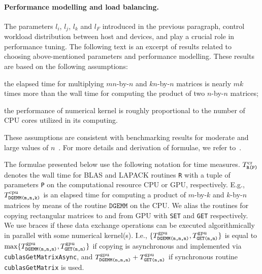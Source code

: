 \documentclass{llncs}
\begin{document}
    \paragraph{Performance modelling and load balancing.} \label{sec:load_balancing_parameters}

    The parameters $l_i$, $l_j$, $l_k$ and $l_F$ 
    introduced in the previous paragraph,
    control workload distribution between host and devices, 
    and play a crucial role in performance tuning.
    The following text is an excerpt of results related to 
    choosing above-mentioned parameters and performance modelling.
    These results are based on the following assumptions: 
    \begin{inparaenum}[(i)]
    \item the elapsed time for 
      multiplying $mn$-by-$n$ and $kn$-by-$n$ matrices
      is nearly $mk$ times more than the wall time for computing the product
      of two $n$-by-$n$ matrices;
    \item the performance of numerical kernel
      is roughly proportional to the number of CPU cores utilized in its computing.
    \end{inparaenum}
    These assumptions are consistent with benchmarking results 
    for moderate and large values of $n$~\cite{GogolenkoBai13}.
    For more details and derivation of formulae, we refer to~\cite{GogolenkoBai13}.

    The formulae presented below use the following notation for time measures.
    $T^{\rm cr}_{\texttt{R(P)}}$ denotes the wall time 
    for BLAS and LAPACK routines {\tt R} with a tuple of parameters {\tt P}
    on the computational resource CPU or GPU, respectively.
    E.g., $T^{\rm cpu}_{\texttt{DGEMM(m,n,k)}}$ is an elapsed time for 
    computing a product of $m$-by-$k$ and $k$-by-$n$ matrices
    by means of the routine $\texttt{DGEMM}$ on the CPU.
    We alias the routines for copying rectangular matrices to and from GPU 
    with {\tt SET} and {\tt GET} respectively.
    We use braces if 
    these data exchange operations can be executed algorithmically 
    in parallel with some numerical kernel(s).
    I.e., $\{T_{\texttt{DGEMM(n,n,n)}}^{\rm gpu},T^{\rm gpu}_{\texttt{GET(n,n)}}\}$ 
    is equal to 
    $\max\{T_{\texttt{DGEMM(n,n,n)}}^{\rm gpu},T^{\rm gpu}_{\texttt{GET(n,n)}}\}$ 
    if copying is asynchronous and implemented 
    via {\tt cublasGetMatrixAsync}, 
    and $T_{\texttt{DGEMM(n,n,n)}}^{\rm gpu}+T^{\rm gpu}_{\texttt{GET(n,n)}}$ 
    if synchronous routine {\tt cublasGetMatrix} is used.
\end{document}
